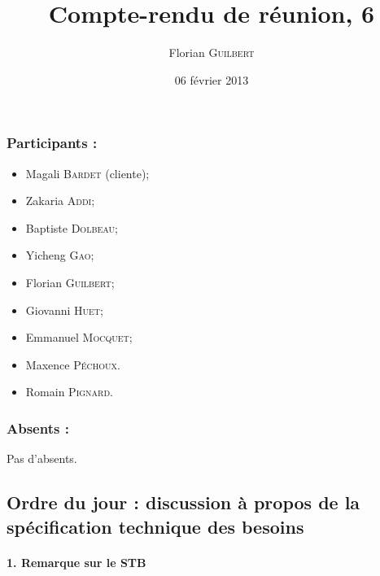 \documentclass[a4paper,10pt]{article}
\author{Florian \textsc{Guilbert}}
\title{Compte-rendu de réunion, 6}
\date{06 février 2013}
\begin{document}
\maketitle

\subsubsection*{Participants : }
\begin{itemize}
    \item Magali \textsc{Bardet} (cliente);
    \item Zakaria \textsc{Addi};
    \item Baptiste \textsc{Dolbeau};
    \item Yicheng \textsc{Gao};
    \item Florian \textsc{Guilbert};
    \item Giovanni \textsc{Huet};
    \item Emmanuel \textsc{Mocquet};
    \item Maxence  \textsc{Péchoux}.
    \item Romain \textsc{Pignard}.
\end{itemize}

\subsubsection*{Absents : }
Pas d'absents.

\subsection*{Ordre du jour : discussion à propos de la spécification
technique des besoins}

\paragraph{1. Remarque sur le STB}
\end{document}
